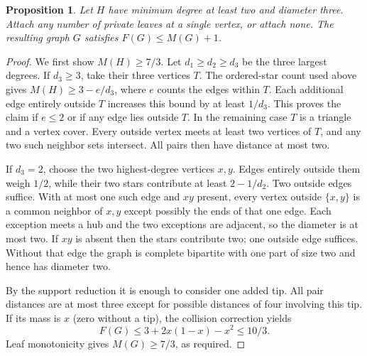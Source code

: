 \documentclass[11pt,a4paper]{article}
\newtheorem{proposition}[theorem]{Proposition}
\begin{document}
\begin{proposition}\label{p11-prop:diam-three}
Let $H$ have minimum degree at least two and diameter three. Attach
any number of private leaves at a single vertex, or attach none.
The resulting graph $G$ satisfies $F(G)\le M(G)+1$.
\end{proposition}
\begin{proof}
We first show $M(H)\ge7/3$. Let $d_1\ge d_2\ge d_3$ be the three
largest degrees. If $d_3\ge3$, take their three vertices $T$.
The ordered-star count used above gives $M(H)\ge3-e/d_3$,
where $e$ counts the edges within $T$. Each additional edge entirely
outside $T$ increases this bound by at least $1/d_3$.
This proves the claim if $e\le2$ or if any edge lies outside $T$.
In the remaining case $T$ is a triangle and a vertex cover. Every
outside vertex meets at least two vertices of $T$, and any two such
neighbor sets intersect. All pairs then have distance at most two.

If $d_3=2$, choose the two highest-degree vertices $x,y$. Edges
entirely outside them weigh $1/2$, while their two stars contribute
at least $2-1/d_2$. Two outside edges suffice. With at most one such
edge and $xy$ present, every vertex outside $\{x,y\}$ is a common
neighbor of $x,y$ except possibly the ends of that one edge. Each
exception meets a hub and the two exceptions are adjacent, so the
diameter is at most two. If $xy$ is absent then the stars contribute
two; one outside edge suffices. Without that edge the graph is
complete bipartite with one part of size two and hence has diameter two.

By the support reduction it is enough to consider one added tip.
All pair distances are at most three except for possible distances of
four involving this tip. If its mass is $x$ (zero without a tip),
the collision correction yields
\[
 F(G)\le3+2x(1-x)-x^2\le10/3.
\]
Leaf monotonicity gives $M(G)\ge7/3$, as required.
\end{proof}
\end{document}
